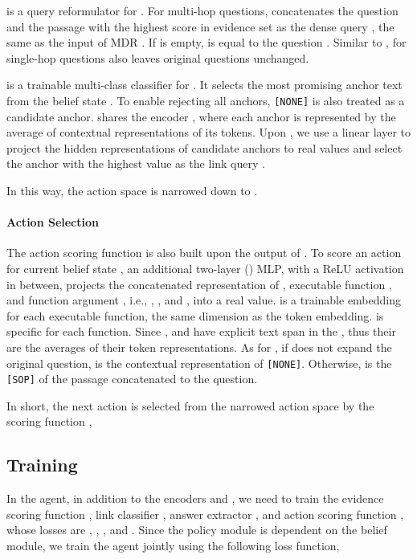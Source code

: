 \documentclass[11pt]{article}
\begin{document}
 is a query reformulator for .
For multi-hop questions,  concatenates the question  and the passage with the highest score in evidence set  as the dense query , the same as the input of MDR \citep{xiong2021answering}.
If  is empty,  is equal to the question .
Similar to ,  for single-hop questions also leaves original questions unchanged.

 is a trainable multi-class classifier for .
It selects the most promising anchor text from the belief state .
To enable rejecting all anchors, \verb|[NONE]| is also treated as a candidate anchor.
 shares the encoder , where each anchor is represented by the average of contextual representations of its tokens.
Upon , we use a linear layer to project the hidden representations of candidate anchors to real values and select the anchor with the highest value as the link query .

In this way, the action space is narrowed down to .

\paragraph{Action Selection}
The action scoring function  is also built upon the output of .
To score an action  for current belief state , an additional two-layer () MLP, with a ReLU activation in between, projects the concatenated representation of , executable function , and function argument , i.e., , , and , into a real value.
 is a trainable embedding for each executable function, the same dimension as the token embedding.
 is specific for each function.
Since ,  and  have explicit text span in the , thus their  are the averages of their token representations.
As for , if  does not expand the original question,  is the contextual representation of \verb|[NONE]|. 
Otherwise,  is the \verb|[SOP]| of the passage concatenated to the question.

In short, the next action is selected from the narrowed action space  by the scoring function ,


\subsection{Training}\label{training}
In the agent, in addition to the encoders  and , we need to train the evidence scoring function , link classifier ,  answer extractor , and action scoring function , whose losses are , , , and .
Since the policy module is dependent on the belief module, we train the agent jointly using the following loss function,
\end{document}
